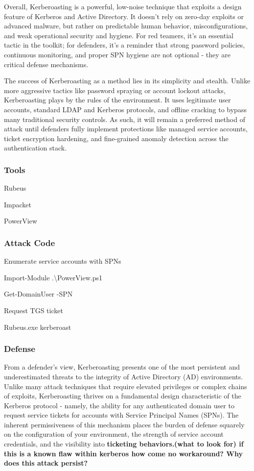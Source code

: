 Overall, Kerberoasting is a powerful, low-noise technique that exploits a design feature of Kerberos and Active Directory. It doesn’t rely on zero-day exploits or advanced malware, but rather on predictable human behavior, misconfigurations, and weak operational security and hygiene. For red teamers, it’s an essential tactic in the toolkit; for defenders, it’s a reminder that strong password policies, continuous monitoring, and proper SPN hygiene are not optional - they are critical defense mechanisms.

The success of Kerberoasting as a method lies in its simplicity and stealth. Unlike more aggressive tactics like password spraying or account lockout attacks, Kerberoasting plays by the rules of the environment. It uses legitimate user accounts, standard LDAP and Kerberos protocols, and offline cracking to bypass many traditional security controls. As such, it will remain a preferred method of attack until defenders fully implement protections like managed service accounts, ticket encryption hardening, and fine-grained anomaly detection across the authentication stack.

\subsubsection{\textbf{Tools}}

Rubeus

Impacket

PowerView

\subsubsection{\textbf{Attack Code}}

Enumerate service accounts with SPNs

Import-Module .\textbackslash{}PowerView.ps1

Get-DomainUser -SPN

Request TGS ticket

Rubeus.exe kerberoast

\subsubsection{Defense}

From a defender’s view, Kerberoasting presents one of the most persistent and underestimated threats to the integrity of Active Directory (AD) environments. Unlike many attack techniques that require elevated privileges or complex chains of exploits, Kerberoasting thrives on a fundamental design characteristic of the Kerberos protocol - namely, the ability for any authenticated domain user to request service tickets for accounts with Service Principal Names (SPNs). The inherent permissiveness of this mechanism places the burden of defense squarely on the configuration of your environment, the strength of service account credentials, and the visibility into \textbf{ticketing behaviors.(what to look for) if this is a known flaw within kerberos how come no workaround? Why does this attack persist?}

